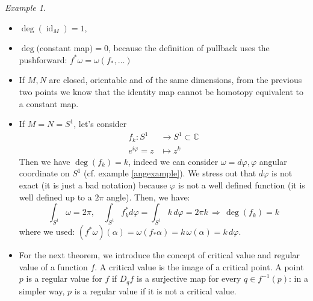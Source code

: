 \documentclass[a4paper,11pt,titlepage, article, oneside]{memoir}
\numberwithin{equation}{section}
\theoremstyle{definition}
\theoremstyle{remark}
\newtheorem{example}[theorem]{Example}
\DeclareMathOperator{\id}{id}
\begin{document}
\begin{tcolorbox}
\begin{example} \label{degreeexample}
$ $
\begin{itemize}
\item $\deg(\id_M) = 1$,
\item $\deg($constant map$)=0$, because the definition of pullback uses the pushforward: $f^* \omega = \omega (f_*, \ldots)$
\item If $M, N$ are closed, orientable and of the same dimensions, from the previous two points we know that the identity map cannot be homotopy equivalent to a constant map.
\item If $M=N=S^1$, let's consider
\begin{align*}
f_k \colon S^1 &\rightarrow S^1 \subset \mathbb{C} \\
e^{i \varphi} = z &\mapsto z^k
\end{align*}
Then we have $\deg(f_k) = k$, indeed we can consider $\omega = d\varphi, \varphi$ angular coordinate on $S^1$ (cf. example \ref{angexample}). We stress out that $d\varphi$ is not exact (it is just a bad notation) because $\varphi$ is not a well defined function (it is well defined up to a $2\pi$ angle). Then, we have:
$$\int_{S^1} \omega = 2\pi, \quad \int_{S^1} f_k^* d\varphi = \int_{S^1} k \,d\varphi = 2\pi k \, \Rightarrow \,  \deg(f_k)=k$$
where we used: $(f^* \omega)(\alpha) = \omega(f_* \alpha) = k \,\omega(\alpha) = k \,d\varphi$.
\item For the next theorem, we introduce the concept of critical value and regular value of a function $f$. A critical value is the image of a critical point. A point $p$ is a regular value for $f$ if $D_q f$ is a surjective map for every $q \in f^{-1}(p)$: in a simpler way, $p$ is a regular value if it is not a critical value.
\end{itemize}
\end{example}
\end{tcolorbox}
\end{document}
